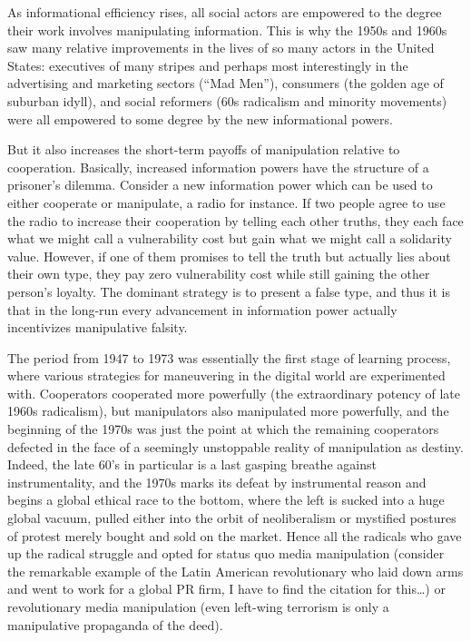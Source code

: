 \documentclass[12pt,book]{article}
\begin{document}
As informational efficiency rises, all social actors are empowered to
the degree their work involves manipulating information. This is why the
1950s and 1960s saw many relative improvements in the lives of so many
actors in the United States: executives of many stripes and perhaps most
interestingly in the advertising and marketing sectors (``Mad Men''),
consumers (the golden age of suburban idyll), and social reformers (60s
radicalism and minority movements) were all empowered to some degree by
the new informational powers.

But it also increases the short-term payoffs of manipulation relative to
cooperation. Basically, increased information powers have the structure
of a prisoner's dilemma. Consider a new information power which can be
used to either cooperate or manipulate, a radio for instance. If two
people agree to use the radio to increase their cooperation by telling
each other truths, they each face what we might call a vulnerability
cost but gain what we might call a solidarity value. However, if one of
them promises to tell the truth but actually lies about their own type,
they pay zero vulnerability cost while still gaining the other person's
loyalty. The dominant strategy is to present a false type, and thus it
is that in the long-run every advancement in information power actually
incentivizes manipulative falsity.

The period from 1947 to 1973 was essentially the first stage of learning
process, where various strategies for maneuvering in the digital world
are experimented with. Cooperators cooperated more powerfully (the
extraordinary potency of late 1960s radicalism), but manipulators also
manipulated more powerfully, and the beginning of the 1970s was just the
point at which the remaining cooperators defected in the face of a
seemingly unstoppable reality of manipulation as destiny. Indeed, the
late 60's in particular is a last gasping breathe against
instrumentality, and the 1970s marks its defeat by instrumental reason
and begins a global ethical race to the bottom, where the left is sucked
into a huge global vacuum, pulled either into the orbit of neoliberalism
or mystified postures of protest merely bought and sold on the market.
Hence all the radicals who gave up the radical struggle and opted for
status quo media manipulation (consider the remarkable example of the
Latin American revolutionary who laid down arms and went to work for a
global PR firm, I have to find the citation for this\ldots{}) or
revolutionary media manipulation (even left-wing terrorism is only a
manipulative propaganda of the deed).
\end{document}
